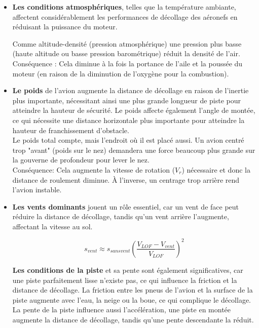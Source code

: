 	\begin{itemize}
		\item \textbf{Les conditions atmosphériques}, telles que la température ambiante, affectent considérablement les performances de décollage des aéronefs en réduisant la puissance du moteur.
		
		
		Comme altitude-densité (pression atmosphérique) une pression plus basse (haute altitude ou basse pression barométrique) réduit la densité de l'air. \\
		
		Conséquence : Cela diminue à la fois la portance de l'aile et la poussée du moteur (en raison de la diminution de l'oxygène pour la combustion). \\
		
	
		
		
		\item\textbf{Le poids} de l'avion augmente la distance de décollage en raison de l'inertie plus importante, nécessitant ainsi une plus grande longueur de piste pour atteindre la hauteur de sécurité. Le poids affecte également l'angle de montée, ce qui nécessite une distance horizontale plus importante pour atteindre la hauteur de franchissement d'obstacle. \\
		
		Le poids total compte, mais l'endroit où il est placé aussi.
		Un avion centré trop "avant" (poids sur le nez) demandera une force beaucoup plus grande sur la gouverne de profondeur pour lever le nez.\\
		
		Conséquence: Cela augmente la vitesse de rotation ($V_r$) nécessaire et donc la distance de roulement diminue. À l'inverse, un centrage trop arrière rend l'avion instable.
		
		\item\textbf{Les vents dominants} jouent un rôle essentiel, car un vent de face peut réduire la distance de décollage, tandis qu'un vent arrière l'augmente, affectant la vitesse au sol.
		
		
		\begin{equation}
			s_{vent} \approx s_{sans vent} \left( \frac{V_{LOF} - V_{vent}}{V_{LOF}} \right)^2
		\end{equation}
		
		\textbf{Les conditions de la piste} et sa pente sont également significatives, car une piste parfaitement lisse n'existe pas, ce qui influence la friction et la distance de décollage.
		La friction entre les pneus de l'avion et la surface de la piste augmente avec l'eau, la neige ou la boue, ce qui complique le décollage.
		La pente de la piste influence aussi  l'accélération, une piste en montée augmente la distance de décollage, tandis qu'une pente descendante la réduit.\\
		
		
		\end{itemize}
			
